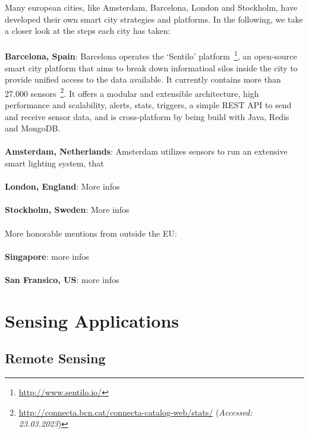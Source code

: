 Many european cities, like Amsterdam, Barcelona, London and Stockholm, have developed their own smart city strategies and platforms. In the following, we take a closer look at the steps each city has taken:\\
\\
\textbf{Barcelona, Spain}: Barcelona operates the `Sentilo' platform~\footnote{\url{http://www.sentilo.io/}}, an open-source smart city platform that aims to break down informatioal silos inside the city to provide unified access to the data available. It currently contains more than 27.000 sensors~\footnote{\url{http://connecta.bcn.cat/connecta-catalog-web/stats/} (\textit{Accessed: 23.03.2023})}. It offers a modular and extensible architecture, high performance and scalability, alerts, stats, triggers, a simple REST API to send and receive sensor data, and is cross-platform by being build with Java, Redis and MongoDB.\\
\\
\textbf{Amsterdam, Netherlands}: Amsterdam utilizes sensors to run an extensive smart lighting system, that\\
\\
\textbf{London, England}: More infos\\
\\
\textbf{Stockholm, Sweden}: More infos\\
\\
More honorable mentions from outside the EU:\\
\\
\textbf{Singapore}: more infos\\
\\
\textbf{San Fransico, US}: more infos\\

\section{Sensing Applications}

\subsection{Remote Sensing}

